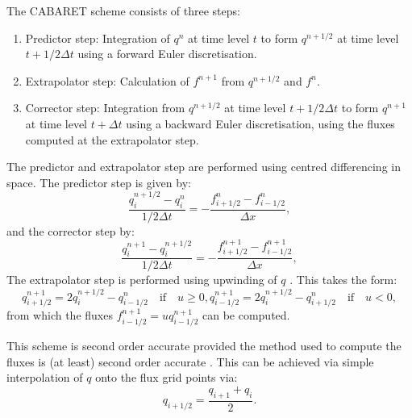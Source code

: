 \documentclass[a4paper]{book}
\begin{document}
The CABARET scheme consists of three steps:
\begin{enumerate}
  \item Predictor step: Integration of $q^n$ at time level $t$ to form
        $q^{n + 1 / 2}$ at time level $t + 1 / 2 \Delta t$ using a forward Euler
        discretisation.
  \item Extrapolator step: Calculation of $f^{n + 1}$ from $q^{n + 1 / 2}$ and $f^n$.
  \item Corrector step: Integration from $q^{n + 1 / 2}$ at time level
        $t + 1 / 2 \Delta t$ to form $q^{n + 1}$ at time level $t + \Delta t$
        using a backward Euler discretisation, using the fluxes computed at
        the extrapolator step.
\end{enumerate}
The predictor and extrapolator step are performed using centred differencing
in space. The predictor step is given by:
\begin{equation}
  \frac{q_i^{n + 1 / 2} - q_i^n}{1 / 2 \Delta t} = -\frac{f_{i + 1 / 2}^n - f_{i - 1 /2}^n}{\Delta x},
\end{equation}
and the corrector step by:
\begin{equation}
  \frac{q_i^{n + 1} - q_i^{n + 1 / 2}}{1 / 2 \Delta t} = -\frac{f_{i + 1 / 2}^{n + 1} - f_{i - 1 /2}^{n + 1}}{\Delta x},
\end{equation}
The extrapolator step is performed using upwinding of $q$ \citep{karabasov2009}.
This takes the form:
\begin{subequations}
  \begin{equation}
    q^{n + 1}_{i + 1 / 2} = 2 q^{n + 1 / 2}_i - q^{n}_{i - 1 / 2} \quad \textrm{if} \quad u \geq 0,
  \end{equation}
  \begin{equation}
    q^{n + 1}_{i - 1 / 2} = 2 q^{n + 1 / 2}_i - q^{n}_{i + 1 / 2} \quad \textrm{if} \quad u < 0,
  \end{equation}
\end{subequations}
from which the fluxes $f^{n + 1}_{i - 1 / 2} = u q^{n + 1}_{i - 1 / 2}$ can be computed.

This scheme is second order accurate provided the method used to compute the
fluxes is (at least) second order accurate \citep{karabasov2009}. This can be
achieved via simple interpolation of $q$ onto the flux grid points via:
\begin{equation}
  q_{i + 1/ 2} = \frac{q_{i + 1} + q_i}{2}.
\end{equation}
\end{document}
